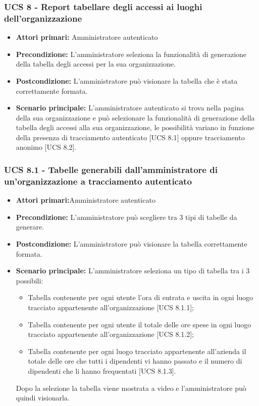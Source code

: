 \subsubsection{UCS 8 - Report tabellare degli accessi ai luoghi dell'organizzazione}%
\begin{itemize}
\item \textbf{Attori primari:} Amministratore autenticato
\item \textbf{Precondizione:} L'amministratore seleziona la funzionalità di generazione della tabella degli accessi per la sua organizzazione.
\item \textbf{Postcondizione:} L'amministratore può visionare la tabella che è stata correttamente formata.
\item \textbf{Scenario principale:} L'amministratore autenticato si trova nella pagina della sua organizzazione e può selezionare la funzionalità di generazione della tabella degli accessi alla sua organizzazione, le possibilità variano in funzione della presenza di tracciamento autenticato [UCS 8.1] oppure tracciamento anonimo [UCS 8.2].
\end{itemize}

\subsubsection{UCS 8.1 - Tabelle generabili dall'amministratore di un'organizzazione a tracciamento autenticato}%
\begin{itemize}
\item \textbf{Attori primari:}Amministratore autenticato
\item \textbf{Precondizione:} L'amministratore può scegliere tra 3 tipi di tabelle da generare.
\item \textbf{Postcondizione:} L'amministratore può visionare la tabella correttamente formata.
\item \textbf{Scenario principale:} L'amministratore seleziona un tipo di tabella tra i 3 possibili:
	\begin{itemize}%
	\item Tabella contenente per ogni utente l'ora di entrata e uscita in ogni luogo tracciato appartenente all'organizzazione [UCS 8.1.1];
	\item Tabella contenente per ogni utente il totale delle ore spese in ogni luogo tracciato appartenente all'organizzazione [UCS 8.1.2];
	\item Tabella contenente per ogni luogo tracciato appartenente all'azienda il totale delle ore che tutti i dipendenti vi hanno passato e il numero di dipendenti che li hanno frequentati [UCS 8.1.3].
\end{itemize}
Dopo la selezione la tabella viene mostrata a video e l'amministratore può quindi visionarla.
\end{itemize}


